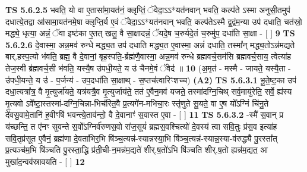 \documentclass[17pt]{extarticle}
\begin{document}
                                \textbf{ TS 5.6.2.5} \newline
                  भवति॒ यो वा ए॒तासा॑मा॒यत॑नं॒ क्लृप्तिं॒ ॅवेदा॒ऽऽ*यत॑नवान् भवति॒ कल्प॑ते ऽस्मा अनुसी॒तमुप॑ दधात्ये॒तद्वा आ॑सामा॒यत॑नमे॒षा क्लृप्ति॒र्य ए॒वं ॅवेदा॒ऽऽ*यत॑नवान् भवति॒ कल्प॑तेऽस्मै द्व॒द्वंम॒न्या उप॑ दधाति॒ चत॑स्रो॒ मद्ध्ये॒ धृत्या॒ अन्नं॒ ॅवा इष्ट॑का ए॒तत् खलु॒ वै सा॒क्षादन्नं॒ ॅयदे॒ष च॒रुर्यदे॒तं च॒रुमु॑प॒ दधा॑ति सा॒क्षा - [  ] \textbf{  9} \newline
                  \newline
                                \textbf{ TS 5.6.2.6} \newline
                  दे॒वास्मा॒ अन्न॒मव॑ रुन्धे मद्ध्य॒त उप॑ दधाति मद्ध्य॒त ए॒वास्मा॒ अन्नं॑ दधाति॒ तस्मा᳚न् मद्ध्य॒तोऽन्न॑मद्यते बार्.हस्प॒त्यो भ॑वति॒ ब्रह्म॒ वै दे॒वानां॒ बृह॒स्पति॒-र्ब्रह्म॑णै॒वास्मा॒ अन्न॒मव॑ रुन्धे ब्रह्मवर्च॒सम॑सि ब्रह्मवर्च॒साय॒ त्वेत्या॑ह तेज॒स्वी ब्र॑ह्मवर्च॒सी भ॑वति॒ यस्यै॒ष उ॑पधी॒यते॒ य उ॑ चैनमे॒वं ॅवेद॑ ॥ \textbf{  10} \newline
                  \newline
                      (अ॒मृत॑ - मस्मै - जायते॒ यस्यै॒ता - उ॑पधी॒यन्ते॒ य उ॑ - प॒र्जन्य॑ - उप॒दधा॑ति सा॒क्षाथ् - स॒प्तच॑त्वारिꣳशच्च)  \textbf{(A2)} \newline \newline
                                        \textbf{ TS 5.6.3.1} \newline
                  भू॒ते॒ष्ट॒का उप॑ दधा॒त्यत्रा᳚त्र॒ वै मृ॒त्युर्जा॑यते॒ यत्र॑यत्रै॒व मृ॒त्युर्जाय॑ते॒ तत॑ ए॒वैन॒मव॑ यजते॒ तस्मा॑दग्नि॒चिथ् सर्व॒मायु॑रेति॒ सर्वे॒ ह्य॑स्य मृ॒त्यवो ऽवे᳚ष्टा॒स्तस्मा॑-दग्नि॒चिन्ना-भिच॑रित॒वै प्र॒त्यगे॑न-मभिचा॒रः स्तृ॑णुते सू॒यते॒ वा ए॒ष यो᳚ऽग्निं चि॑नु॒ते दे॑वसु॒वामे॒तानि॑ ह॒वीꣳषि॑ भवन्त्ये॒ताव॑न्तो॒ वै दे॒वानाꣳ॑ स॒वास्त ए॒वा - [  ] \textbf{  11} \newline
                  \newline
                                \textbf{ TS 5.6.3.2} \newline
                  -स्मै॑ स॒वान् प्र य॑च्छन्ति॒ त ए॑नꣳ सुवन्ते स॒वो᳚ऽग्निर्व॑रुणस॒वो रा॑ज॒सूयं॑ ब्रह्मस॒वश्चित्यो॑ दे॒वस्य॑ त्वा सवि॒तुः प्र॑स॒व इत्या॑ह सवि॒तृप्र॑सूत ए॒वैनं॒ ब्रह्म॑णा दे॒वता॑भिर॒भि षि॑ञ्च॒त्यन्न॑-स्यान्नस्या॒भि षि॑ञ्च॒त्यन्न॑-स्यान्न॒स्या-व॑रुद्ध्यै पु॒रस्ता᳚त् प्र॒त्यञ्च॑म॒भि षि॑ञ्चति पु॒रस्ता॒द्धि प्र॑ती॒ची-न॒मन्न॑म॒द्यते॑ शीर्.ष॒तो॑ऽभि षि॑ञ्चति शीर्.ष॒तो ह्यन्न॑म॒द्यत॒ आ मुखा॑द॒न्वव॑स्रावयति - [  ] \textbf{  12} \newline
                  \newline
\end{document}
